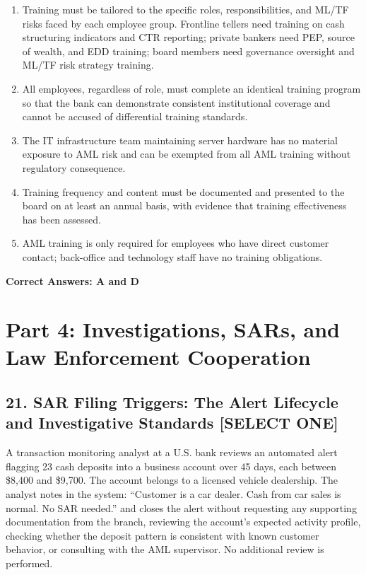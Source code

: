 \documentclass[11pt,a4paper]{article}
\begin{document}
	\begin{enumerate}[label=\Alph*.]
		\item Training must be tailored to the specific roles, responsibilities, and ML/TF risks faced by each employee group. Frontline tellers need training on cash structuring indicators and CTR reporting; private bankers need PEP, source of wealth, and EDD training; board members need governance oversight and ML/TF risk strategy training.
		\item All employees, regardless of role, must complete an identical training program so that the bank can demonstrate consistent institutional coverage and cannot be accused of differential training standards.
		\item The IT infrastructure team maintaining server hardware has no material exposure to AML risk and can be exempted from all AML training without regulatory consequence.
		\item Training frequency and content must be documented and presented to the board on at least an annual basis, with evidence that training effectiveness has been assessed.
		\item AML training is only required for employees who have direct customer contact; back-office and technology staff have no training obligations.
	\end{enumerate}
	\textbf{Correct Answers: A and D}
	
	\section{Part 4: Investigations, SARs, and Law Enforcement Cooperation}
	
	\subsection{21. SAR Filing Triggers: The Alert Lifecycle and Investigative Standards \textnormal{[SELECT ONE]}}
	
	A transaction monitoring analyst at a U.S. bank reviews an automated alert flagging 23 cash deposits into a business account over 45 days, each between \$8,400 and \$9,700. The account belongs to a licensed vehicle dealership. The analyst notes in the system: ``Customer is a car dealer. Cash from car sales is normal. No SAR needed.'' and closes the alert without requesting any supporting documentation from the branch, reviewing the account's expected activity profile, checking whether the deposit pattern is consistent with known customer behavior, or consulting with the AML supervisor. No additional review is performed.
	
\end{document}
